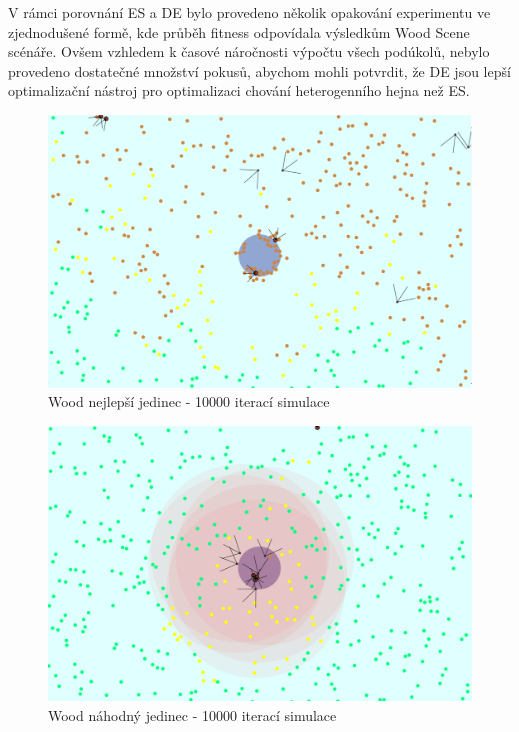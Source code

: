 V rámci porovnání ES a DE bylo provedeno několik opakování experimentu ve zjednodušené formě, kde průběh fitness odpovídala výsledkům Wood Scene scénáře. Ovšem vzhledem k časové náročnosti výpočtu všech podúkolů, nebylo provedeno dostatečné množství pokusů, abychom mohli potvrdit, že DE jsou lepší optimalizační nástroj pro optimalizaci chování heterogenního hejna než ES. 
	\clearpage 
	\begin{figure}[p]\centering
		\includegraphics[width=\columnwidth]{../img/WoodMap/pictures/end.png}
		\caption{Wood nejlepší jedinec - 10000 iterací simulace}
		\label{obr04:bestEnd}
	\end{figure}
	\begin{figure}[p]\centering
		\includegraphics[width=\columnwidth]{../img/WoodMap/pictures/EndRandom.png}
		\caption{Wood náhodný jedinec - 10000 iterací simulace}
		\label{obr04:randomEnd}
	\end{figure}

